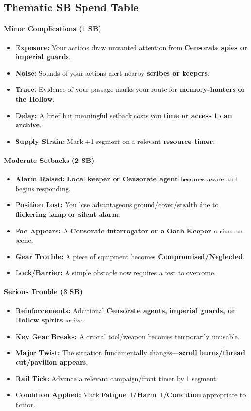 \subsection*{Thematic SB Spend Table}
\label{sec:lethai-thora-sb}

\paragraph{Minor Complications (1 SB)}
\begin{itemize}
\item \textbf{Exposure:} Your actions draw unwanted attention from \textbf{Censorate spies or imperial guards}.
\item \textbf{Noise:} Sounds of your actions alert nearby \textbf{scribes or keepers}.
\item \textbf{Trace:} Evidence of your passage marks your route for \textbf{memory-hunters or the Hollow}.
\item \textbf{Delay:} A brief but meaningful setback costs you \textbf{time or access to an archive}.
\item \textbf{Supply Strain:} Mark +1 segment on a relevant \textbf{resource timer}.
\end{itemize}

\paragraph{Moderate Setbacks (2 SB)}
\begin{itemize}
\item \textbf{Alarm Raised:} \textbf{Local keeper or Censorate agent} becomes aware and begins responding.
\item \textbf{Position Lost:} You lose advantageous ground/cover/stealth due to \textbf{flickering lamp or silent alarm}.
\item \textbf{Foe Appears:} A \textbf{Censorate interrogator or a Oath-Keeper} arrives on scene.
\item \textbf{Gear Trouble:} A piece of equipment becomes \textbf{Compromised/Neglected}.
\item \textbf{Lock/Barrier:} A simple obstacle now requires a test to overcome.
\end{itemize}

\paragraph{Serious Trouble (3 SB)}
\begin{itemize}
\item \textbf{Reinforcements:} Additional \textbf{Censorate agents, imperial guards, or Hollow spirits} arrive.
\item \textbf{Key Gear Breaks:} A crucial tool/weapon becomes temporarily unusable.
\item \textbf{Major Twist:} The situation fundamentally changes---\textbf{scroll burns/thread cut/pavilion appears}.
\item \textbf{Rail Tick:} Advance a relevant campaign/front timer by 1 segment.
\item \textbf{Condition Applied:} Mark \textbf{Fatigue 1/Harm 1/Condition} appropriate to fiction.
\end{itemize}

